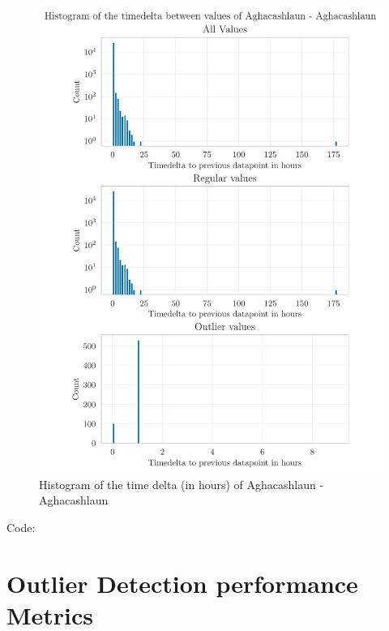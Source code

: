 \begin{figure}[htp]
    \centering
    \includegraphics{./plots/pdfs/36022-ie/time_delta_histogram_36022-ie.pdf}
    \caption{Histogram of the time delta (in hours) of Aghacashlaun - Aghacashlaun}
    \label{figure:time-delta-histogram-36022-ie}
\end{figure}
\par
Code: \cite{zelenayOutlierDetectionWater2022}

\section{Outlier Detection performance Metrics}
